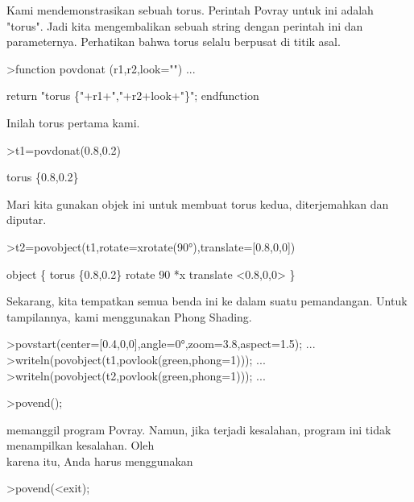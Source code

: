 \documentclass{article}
\begin{document}
\begin{eulernotebook}
\begin{eulercomment}
Kami mendemonstrasikan sebuah torus. Perintah Povray untuk ini adalah
"torus". Jadi kita mengembalikan sebuah string dengan perintah ini dan
parameternya. Perhatikan bahwa torus selalu berpusat di titik asal.
\end{eulercomment}
\begin{eulerprompt}
>function povdonat (r1,r2,look="") ...
\end{eulerprompt}
\begin{eulerudf}
  return "torus \{"+r1+","+r2+look+"\}";
  endfunction
\end{eulerudf}
\begin{eulercomment}
Inilah torus pertama kami.
\end{eulercomment}
\begin{eulerprompt}
>t1=povdonat(0.8,0.2)
\end{eulerprompt}
\begin{euleroutput}
  torus \{0.8,0.2\}
\end{euleroutput}
\begin{eulercomment}
Mari kita gunakan objek ini untuk membuat torus kedua, diterjemahkan
dan diputar.
\end{eulercomment}
\begin{eulerprompt}
>t2=povobject(t1,rotate=xrotate(90°),translate=[0.8,0,0])
\end{eulerprompt}
\begin{euleroutput}
  object \{ torus \{0.8,0.2\}
   rotate 90 *x 
   translate <0.8,0,0>
   \}
\end{euleroutput}
\begin{eulercomment}
Sekarang, kita tempatkan semua benda ini ke dalam suatu pemandangan.
Untuk tampilannya, kami menggunakan Phong Shading.
\end{eulercomment}
\begin{eulerprompt}
>povstart(center=[0.4,0,0],angle=0°,zoom=3.8,aspect=1.5); ...
>writeln(povobject(t1,povlook(green,phong=1))); ...
>writeln(povobject(t2,povlook(green,phong=1))); ...
\end{eulerprompt}
\begin{eulerttcomment}
 >povend();
\end{eulerttcomment}
\begin{eulercomment}
memanggil program Povray. Namun, jika terjadi kesalahan, program ini
tidak menampilkan kesalahan. Oleh\\
karena itu, Anda harus menggunakan

\end{eulercomment}
\begin{eulerttcomment}
 >povend(<exit);
\end{eulerttcomment}
\begin{eulercomment}


\end{eulercomment}
\end{eulernotebook}
\end{document}
